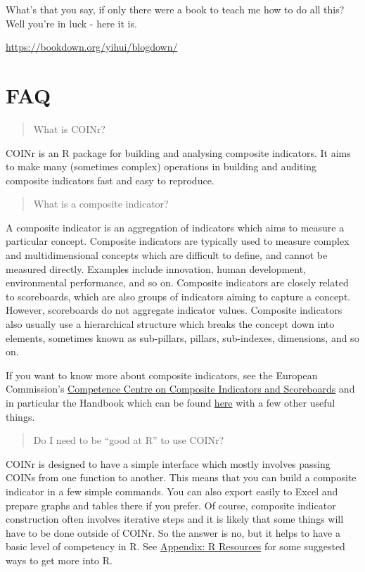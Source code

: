 \documentclass[
]{book}
\begin{document}
What's that you say, if only there were a book to teach me how to do all this? Well you're in luck - here it is.

\url{https://bookdown.org/yihui/blogdown/}

\hypertarget{faq}{%
\chapter{FAQ}\label{faq}}

\begin{quote}
What is COINr?
\end{quote}

COINr is an R package for building and analysing composite indicators. It aims to make many (sometimes complex) operations in building and auditing composite indicators fast and easy to reproduce.

\begin{quote}
What is a composite indicator?
\end{quote}

A composite indicator is an aggregation of indicators which aims to measure a particular concept. Composite indicators are typically used to measure complex and multidimensional concepts which are difficult to define, and cannot be measured directly. Examples include innovation, human development, environmental performance, and so on. Composite indicators are closely related to scoreboards, which are also groups of indicators aiming to capture a concept. However, scoreboards do not aggregate indicator values. Composite indicators also usually use a hierarchical structure which breaks the concept down into elements, sometimes known as sub-pillars, pillars, sub-indexes, dimensions, and so on.

If you want to know more about composite indicators, see the European Commission's \href{https://knowledge4policy.ec.europa.eu/composite-indicators/about_en}{Competence Centre on Composite Indicators and Scoreboards} and in particular the Handbook which can be found \href{https://knowledge4policy.ec.europa.eu/composite-indicators/toolkit_en}{here} with a few other useful things.

\begin{quote}
Do I need to be ``good at R'' to use COINr?
\end{quote}

COINr is designed to have a simple interface which mostly involves passing COINs from one function to another. This means that you can build a composite indicator in a few simple commands. You can also export easily to Excel and prepare graphs and tables there if you prefer. Of course, composite indicator construction often involves iterative steps and it is likely that some things will have to be done outside of COINr. So the answer is no, but it helps to have a basic level of competency in R. See \protect\hyperlink{appendix-r-resources}{Appendix: R Resources} for some suggested ways to get more into R.
\end{document}
